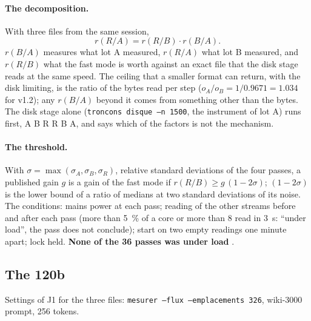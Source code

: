 \paragraph{The decomposition.} With three files from the same session,
\[
r(R/A) = r(R/B) \cdot r(B/A) .
\]
$r(B/A)$ measures what lot A measured, $r(R/A)$ what lot B measured, and $r(R/B)$ what the fast mode is worth against an exact file that the disk stage reads at the same speed. The ceiling that a smaller format can return, with the disk limiting, is the ratio of the bytes read per step ($o_A / o_B = 1/\num{0.9671} = \num{1.034}$ for v1.2); any $r(B/A)$ beyond it comes from something other than the bytes. The disk stage alone (\texttt{troncons disque --n 1500}, the instrument of lot A) runs first, A B R R B A, and says which of the factors is not the mechanism.

\paragraph{The threshold.} With $\sigma = \max(\sigma_A, \sigma_B, \sigma_R)$, relative standard deviations of the four passes, a published gain $g$ is a gain of the fast mode if $r(R/B) \ge g\,(1 - 2\sigma)$; $(1 - 2\sigma)$ is the lower bound of a ratio of medians at two standard deviations of its noise. The conditions: mains power at each pass; reading of the other streams before and after each pass (more than \SI{5}{\percent} of a core or more than \SI{8}{\Mo} read in \SI{3}{\second}: ``under load'', the pass does not conclude); start on two empty readings one minute apart; lock held. \textbf{None of the 36 passes was under load} \mes.

\subsection{The 120b}\label{t3jug:sec:v120}

Settings of J1 for the three files: \texttt{mesurer --flux --emplacements 326}, wiki-3000 prompt, 256 tokens.

